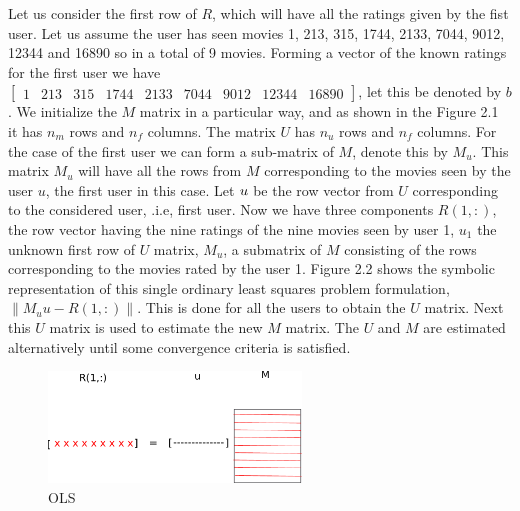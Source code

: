 Let us consider the first row of $R$, which will have all the ratings
given by the fist user. Let us assume the user has seen movies 1, 213, 315,
1744, 2133, 7044, 9012, 12344 and 16890  so in a total of 9 movies. Forming a
vector of the known ratings for the first user we have $\begin{bmatrix}
                                          1 & 213 & 315 & 1744 & 2133 & 7044 &
9012 & 12344 & 16890                                    
                                          \end{bmatrix}
$, let
this be denoted by $b$. We initialize the $M$ matrix in a particular way, and as
shown in the Figure 2.1 it has $n_m$ rows and $n_f$ columns. The matrix $U$ has
$n_u$ rows and $n_f$ columns. For the case of the first user we can form a
sub-matrix of $M$, denote this by $M_u$. This matrix $M_u$ will have all the
rows from $M$ corresponding to the movies seen by the user $u$, the first user
in this case. Let $\boldmath{u}$ be the row vector from $U$ corresponding to the
considered user, .i.e, first user. Now we have three components $R(1,:)$, the
row vector having the nine ratings of the nine movies seen by user 1, $u_1$ the
unknown first row of $U$ matrix, $M_u$, a submatrix of $M$ consisting of the
rows corresponding to the movies rated by the user 1. Figure 2.2 shows the
symbolic representation of this single ordinary least squares problem
formulation, $ \|{M_uu-R(1,:)}\|$. This is done for all the users to obtain the
$U$ matrix. Next this $U$ matrix is used to estimate the new $M$ matrix. The $U$
and $M$ are estimated alternatively until some convergence criteria is
satisfied. 


\begin{figure}[h!]

\includegraphics[width=0.6\textwidth]{ALS_FIG2.pdf}
\caption{OLS }
\label{fig:OLS Decomposition}
\end{figure}









